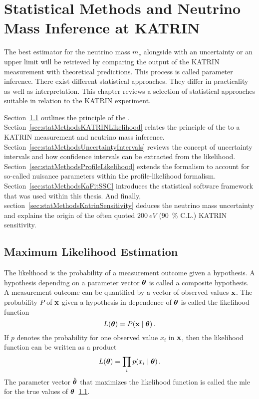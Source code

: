 \def\currentRootFolder{chapter/statisticalMethods}
\def\currentFigureFolder{\currentRootFolder/fig}


\chapter{Statistical Methods and Neutrino Mass Inference at KATRIN}
\label{sec:statMethods}

The best estimator for the neutrino mass $m_\nu$ alongside with an uncertainty or an upper limit will be retrieved by comparing the output of the KATRIN measurement with theoretical predictions. This process is called parameter inference. There exist different statistical approaches. They differ in practicality as well as interpretation. This chapter reviews a selection of statistical approaches suitable in relation to the KATRIN experiment.

Section~\ref{sec:statMethodsMLE} outlines the principle of the . Section~\ref{sec:statMethodsKATRINLikelihood} relates the principle of the  to a KATRIN measurement and neutrino mass inference. Section~\ref{sec:statMethodsUncertaintyIntervals} reviews the concept of uncertainty intervals and how confidence intervals can be extracted from the likelihood. Section~\ref{sec:statMethodsProfileLikelihood} extends the formalism to account for so-called nuisance parameters within the profile-likelihood formalism. Section~\ref{sec:statMethodsKaFitSSC} introduces the statistical software framework that was used within this thesis. And finally, section~\ref{sec:statMethodsKatrinSensitivity} deduces the neutrino mass uncertainty and explains the origin of the often quoted $\SI{200}{eV}$ (\SI{90}{\percent} C.L.) KATRIN sensitivity.

\section{Maximum Likelihood Estimation}
\label{sec:statMethodsMLE}
The likelihood is the probability of a measurement outcome given a hypothesis. A hypothesis depending on a parameter vector $\boldsymbol{\mathbf{\theta}}$ is called a composite hypothesis. A measurement outcome can be quantified by a vector of observed values $\boldsymbol{\mathbf{x}}$. The probability $P$ of $\boldsymbol{\mathbf{x}}$ given a hypothesis in dependence of $\boldsymbol{\mathbf{\theta}}$ is called the likelihood function~\cite{ReviewOfParticlePhysics}
\begin{equation}
	L(\paramVec) = P\giventhat{\dataVec}{\paramVec}
	\fullstop
\end{equation}
If $p$ denotes the probability for one observed value $x_i$ in $\boldsymbol{\mathbf{x}}$, then the likelihood function can be written as a product~\cite{ReviewOfParticlePhysics}
\begin{equation}
	L(\paramVec) = \prod_{i} p\giventhat{x_i}{\paramVec}
	\fullstop
\end{equation}
The parameter vector $\hat{\boldsymbol{\mathbf{\theta}}}$ that maximizes the likelihood function is called the \gls{mle} for the true values of $\boldsymbol{\mathbf{\theta}}$~\ref{sec:statMethodsMLE}.

